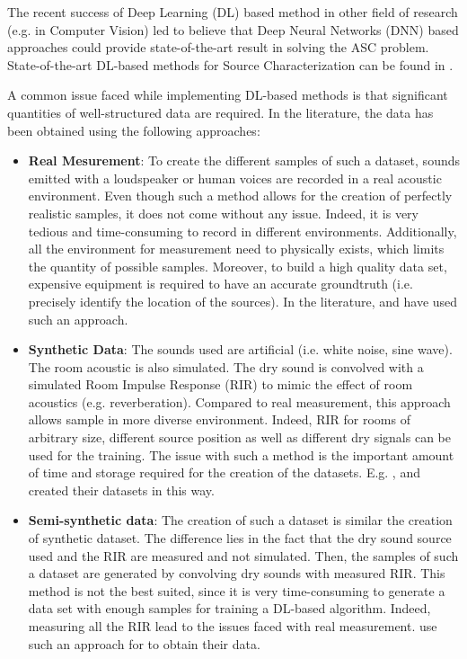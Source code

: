 \documentclass[11pt,a4paper,twoside]{report}
\begin{document}
The recent success of Deep Learning (DL) based method in other field of research (e.g. \cite{ronneberger2015u} in Computer Vision) led to believe that Deep Neural Networks (DNN) based approaches could provide state-of-the-art result in solving the ASC problem. State-of-the-art DL-based methods for Source Characterization can be found in \cite{grumiaux2022survey}.

A common issue faced while implementing DL-based methods is that significant quantities of well-structured data are required. In the literature, the data has been obtained using the following approaches:

\begin{itemize}
    \item \textbf{Real Mesurement}: To create the different samples of such a dataset, sounds emitted with a loudspeaker or human voices are recorded in a real acoustic environment. Even though such a method allows for the creation of perfectly realistic samples, it does not come without any issue. Indeed, it is very tedious and time-consuming to record in different environments. Additionally, all the environment for measurement need to physically exists, which limits the quantity of possible samples. Moreover, to build a high quality data set, expensive equipment is required to have an accurate groundtruth (i.e. precisely identify the location of the sources). In the literature, \cite{he2018deep} and \cite{ferguson2018sound} have used such an approach.
    \item \textbf{Synthetic Data}: The sounds used are artificial (i.e. white noise, sine wave). The room acoustic is also simulated. The dry sound is convolved with a simulated Room Impulse Response (RIR) to mimic the effect of room acoustics (e.g. reverberation). Compared to real measurement, this approach allows sample in more diverse environment. Indeed, RIR for rooms of arbitrary size, different source position as well as different dry signals can be used for the training. The issue with such a method is the important amount of time and storage required for the creation of the datasets. E.g. \cite{chakrabarty2017broadband}, \cite{perotin2018crnn} and \cite{adavanne2018direction} created their datasets in this way.
    \item \textbf{Semi-synthetic data}: The creation of such a dataset is similar the creation of synthetic dataset. The difference lies in the fact that the dry sound source used and the RIR are measured and not simulated. Then, the samples of such a dataset are generated by convolving dry sounds with measured RIR. This method is not the best suited, since it is very time-consuming to generate a data set with enough samples for training a DL-based algorithm. Indeed, measuring all the RIR lead to the issues faced with real measurement. \cite{takeda2016sound} use such an approach for to obtain their data.
\end{itemize}
\end{document}
